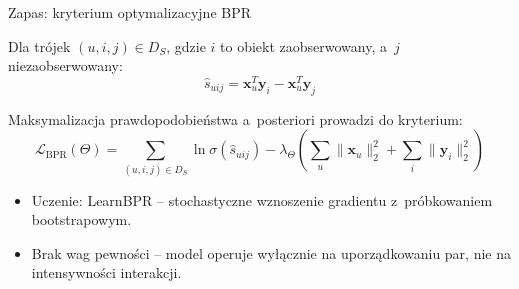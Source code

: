 \documentclass[aspectratio=169,11pt]{beamer}
\begin{document}
\begin{frame}{Zapas: kryterium optymalizacyjne BPR}

  Dla trójek $(u,i,j) \in D_S$, gdzie $i$ to obiekt zaobserwowany, a~$j$ niezaobserwowany:
  \begin{equation*}
    \hat{s}_{uij} = \mathbf{x}_u^T\mathbf{y}_i - \mathbf{x}_u^T\mathbf{y}_j
  \end{equation*}

  \vspace{0.5em}
  Maksymalizacja prawdopodobieństwa a~posteriori prowadzi do kryterium:
  \begin{equation*}
    \mathcal{L}_{\text{BPR}}(\Theta) = \sum_{(u,i,j) \in D_S} \ln \sigma(\hat{s}_{uij})
    - \lambda_\Theta \left( \sum_{u} \|\mathbf{x}_u\|_2^2 + \sum_{i} \|\mathbf{y}_i\|_2^2 \right)
  \end{equation*}

  \vspace{0.8em}
  \begin{itemize}
    \small
    \item Uczenie: LearnBPR -- stochastyczne wznoszenie gradientu z~próbkowaniem
          bootstrapowym.
    \item Brak wag pewności -- model operuje wyłącznie na uporządkowaniu par,
          nie na intensywności interakcji.
  \end{itemize}

\end{frame}

\end{document}
